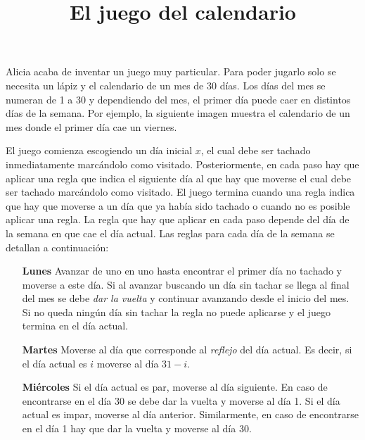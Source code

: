 \documentclass{oci}
\title{El juego del calendario}
\begin{document}
\begin{problemDescription}
  Alicia acaba de inventar un juego muy particular.
  Para poder jugarlo solo se necesita un lápiz y el calendario de un mes de 30 días.
  Los días del mes se numeran de 1 a 30 y dependiendo del mes, el primer día puede caer
  en distintos días de la semana.
  Por ejemplo, la siguiente imagen muestra el calendario de un mes donde el primer día cae un viernes.
  \begin{center}
  \end{center}

  El juego comienza escogiendo un día inicial $x$, el cual debe ser tachado inmediatamente
  marcándolo como visitado.
  Posteriormente, en cada paso hay que aplicar una regla que indica el siguiente día al que hay
  que moverse el cual debe ser tachado marcándolo como visitado.
  El juego termina cuando una regla indica que hay que moverse a un día que ya había sido tachado
  o cuando no es posible aplicar una regla.
  La regla que hay que aplicar en cada paso depende del día de la semana en que cae el día actual.
  Las reglas para cada día de la semana se detallan a continuación:
  \begin{itemize}
   \item[\bf Lunes] Avanzar de uno en uno hasta encontrar el primer día no tachado y moverse a este día.
    Si al avanzar buscando un día sin tachar se llega al final del mes se debe \emph{dar la vuelta} y
    continuar avanzando desde el inicio del mes.
    Si no queda ningún día sin tachar la regla no puede aplicarse y el juego termina en el día actual.

    \item[\bf Martes] Moverse al día que corresponde al \emph{reflejo} del día actual.
    Es decir, si el día actual es $i$ moverse al día $31 - i$.

    \item[\bf Miércoles] Si el día actual es par, moverse al día siguiente.
    En caso de encontrarse en el día 30 se debe dar la vuelta y moverse al día 1.
    Si el día actual es impar, moverse al día anterior.
    Similarmente, en caso de encontrarse en el día 1 hay que dar la vuelta y moverse al día 30.


\end{itemize}
\end{problemDescription}
\end{document}
